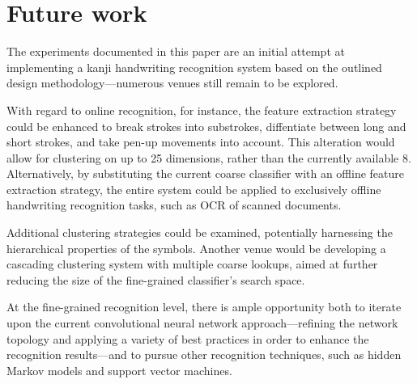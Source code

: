 \documentclass[10pt,conference,a4paper]{IEEEtran}
\begin{document}
	\section{Future work}
	\label{sec:future_work}

	The experiments documented in this paper are an initial \mbox{attempt} at implementing a kanji handwriting recognition \mbox{system}
	based on the outlined design methodology---numerous venues still remain to be explored.
	
	With regard to online recognition, for instance, the feature extraction strategy could be enhanced to break strokes into
	substrokes, diffentiate between long and short strokes, and take pen-up movements into account.
	This alteration would allow for clustering on up to 25 dimensions, rather than the currently available 8.
	Alternatively, by substituting the current coarse classifier with an offline feature extraction strategy, the entire system could
	be applied to exclusively offline handwriting recognition tasks, such as OCR of scanned documents.

	Additional clustering strategies could be examined, potentially harnessing the hierarchical properties of the symbols.
	Another venue would be developing a cascading clustering system with multiple coarse lookups, aimed at further
	reducing the size of the fine-grained classifier's search space.
	
	At the fine-grained recognition level, there is ample opportunity both to iterate upon the current convolutional neural network
	approach---refining the network topology and applying a variety of best practices \cite{simard2003best} in order to enhance the 
	recognition results---and to pursue other recognition techniques, such as hidden Markov models and support vector machines.
	



	
\end{document}
